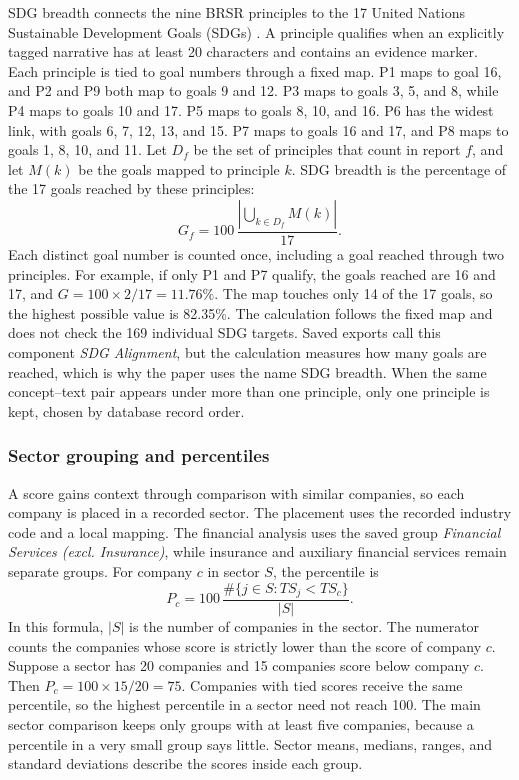 SDG breadth connects the nine BRSR principles to the 17 United Nations Sustainable Development Goals (SDGs) \cite{un2015}. A principle qualifies when an explicitly tagged narrative has at least 20 characters and contains an evidence marker. Each principle is tied to goal numbers through a fixed map. P1 maps to goal 16, and P2 and P9 both map to goals 9 and 12. P3 maps to goals 3, 5, and 8, while P4 maps to goals 10 and 17. P5 maps to goals 8, 10, and 16. P6 has the widest link, with goals 6, 7, 12, 13, and 15. P7 maps to goals 16 and 17, and P8 maps to goals 1, 8, 10, and 11. Let $D_f$ be the set of principles that count in report $f$, and let $M(k)$ be the goals mapped to principle $k$. SDG breadth is the percentage of the 17 goals reached by these principles:
\begin{equation}
G_f=100\,\frac{\left|\bigcup_{k\in D_f}M(k)\right|}{17}.
\label{eq:sdg}
\end{equation}
Each distinct goal number is counted once, including a goal reached through two principles. For example, if only P1 and P7 qualify, the goals reached are 16 and 17, and $G=100\times2/17=11.76\%$. The map touches only 14 of the 17 goals, so the highest possible value is 82.35\%. The calculation follows the fixed map and does not check the 169 individual SDG targets. Saved exports call this component \emph{SDG Alignment}, but the calculation measures how many goals are reached, which is why the paper uses the name SDG breadth. When the same concept--text pair appears under more than one principle, only one principle is kept, chosen by database record order.

\subsubsection{Sector grouping and percentiles}

A score gains context through comparison with similar companies, so each company is placed in a recorded sector. The placement uses the recorded industry code and a local mapping. The financial analysis uses the saved group \emph{Financial Services (excl. Insurance)}, while insurance and auxiliary financial services remain separate groups. For company $c$ in sector $S$, the percentile is
\begin{equation}
P_c=100\,\frac{\#\{j\in S:TS_j<TS_c\}}{|S|}.
\label{eq:percentile}
\end{equation}
In this formula, $|S|$ is the number of companies in the sector. The numerator counts the companies whose score is strictly lower than the score of company $c$. Suppose a sector has 20 companies and 15 companies score below company $c$. Then $P_c=100\times15/20=75$. Companies with tied scores receive the same percentile, so the highest percentile in a sector need not reach 100. The main sector comparison keeps only groups with at least five companies, because a percentile in a very small group says little. Sector means, medians, ranges, and standard deviations describe the scores inside each group.

